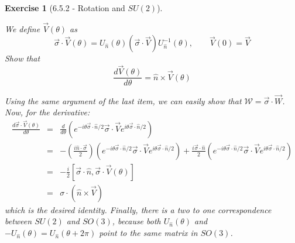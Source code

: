 \documentclass[12pt]{article}
\def\be{\begin{equation}}
\def\ee{\end{equation}}
\def\bea{\begin{eqnarray*}}
\def\eea{\end{eqnarray*}}
\def\f{\frac}
\def\l{\left}
\def\r{\right}
\newtheorem{exercise}{Exercise}
\begin{document}
\begin{exercise}[6.5.2 - Rotation and $SU(2)$]
\begin{exercises}
			\item We define $\vec{V}(\theta)$ as
			\be
				\vec{\sigma}\cdot\vec{V}(\theta) = U_{\hat{n}}(\theta)\l(\vec{\sigma}\cdot\vec{V}\r)U^{-1}_{\hat{n}}(\theta), \quad\quad \vec{V}(0) =\vec{V}
			\ee
			Show that
			\be
				\f{d\vec{V}(\theta)}{d\theta} = \hat{n}\times\vec{V}(\theta)
			\ee
			\begin{multianswer}[true]
				Using the same argument of the last item, we can easily show that $\mathcal{W}=\vec{\sigma}\cdot\vec{W}$. Now, for the derivative:
				\bea
					\f{d\vec{\sigma}\cdot\vec{V}(\theta)}{d\theta} &=& \f{d}{d\theta} \l( e^{-i\theta \vec{\sigma}\cdot\hat{n}/2} \vec{\sigma}\cdot\vec{V} e^{i\theta \vec{\sigma}\cdot\hat{n}/2} \r) \\
						&=& -\l(\f{i \hat{n}\cdot\vec{\sigma}}{2}\r)  \l( e^{-i\theta \vec{\sigma}\cdot\hat{n}/2} \vec{\sigma}\cdot\vec{V} e^{i\theta \vec{\sigma}\cdot\hat{n}/2} \r) + \f{i\vec{\sigma}\cdot\hat{n}}{2} \l( e^{-i\theta \vec{\sigma}\cdot\hat{n}/2} \vec{\sigma}\cdot\vec{V} e^{i\theta \vec{\sigma}\cdot\hat{n}/2} \r) \\
						&=& -\f{i}{2} \l[ \vec{\sigma}\cdot\hat{n}, \vec{\sigma}\cdot \vec{V}(\theta)\r] \\
						&=& \sigma\cdot (\hat{n}\times\vec{V})
				\eea
				which is the desired identity. Finally, there is a two to one correspondence between $SU(2)$ and $SO(3)$, because both $U_{\hat{n}}(\theta)$ and $-U_{\hat{n}}(\theta) = U_{\hat{n}}(\theta + 2\pi)$ point to the same matrix in $SO(3)$. 
			\end{multianswer}
		\end{exercises}
	\end{exercise}
	
\end{document}
